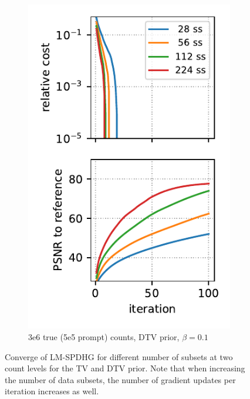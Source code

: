 \begin{figure}
\begin{subfigure}[b]{0.23\textwidth}
    \includegraphics[width=1.0\textwidth]{./figure5d_brain2d_counts_3.0E+06_seed_1_beta_1.0E-01_prior_DTV_niter_ref_20000_fwhm_4.5_4.5_niter_100_ss.pdf}
    \caption{3e6 true (5e5 prompt) counts, DTV prior, $\beta = 0.1$}
  \end{subfigure}

  \caption{Converge of LM-SPDHG for different number of subsets at two count levels for the TV and 
           DTV prior. Note that when increasing the number of data subsets, the number of gradient
           updates per iteration increases as well.}
  \label{fig:num_subsets}
\end{figure}



